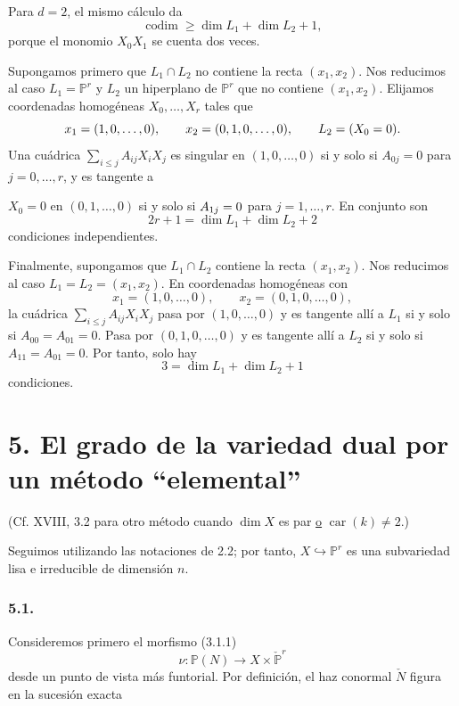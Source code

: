Para $d=2$, el mismo cálculo da
\[
\operatorname{codim}\geq\dim L_1+\dim L_2+1,
\]
porque el monomio $X_0X_1$ se cuenta dos veces.

Supongamos primero que $L_1\cap L_2$ no contiene la recta
$(x_1,x_2)$. Nos reducimos al caso $L_1=\mathbb P^r$ y $L_2$ un
hiperplano de $\mathbb P^r$ que no contiene $(x_1,x_2)$. Elijamos
coordenadas homogéneas $X_0,\ldots,X_r$ tales que
\[
x_1=(1,0,\ldots,0),\qquad
\sisi{x_1}{x_2}=(0,1,0,\ldots,0),\qquad L_2=(X_0=0).
\]
Una cuádrica $\sum_{i\leq j}A_{ij}X_iX_j$ es singular en
$(1,0,\ldots,0)$ si y solo si $A_{0j}=0$ para $j=0,\ldots,r$, y es
tangente a

\pageoriginale

$X_0=0$ en $(0,1,\ldots,0)$ si y solo si
$A_{\sisi{i}{1}j}=0$ para $j=1,\ldots,r$. En conjunto son
\[
2r+1=\dim L_1+\dim L_2+2
\]
condiciones independientes.

Finalmente, supongamos que $L_1\cap L_2$ contiene la recta
$(x_1,x_2)$. Nos reducimos al caso $L_1=L_2=(x_1,x_2)$. En
coordenadas homogéneas con
\[
x_1=(1,0,\ldots,0),\qquad x_2=(0,1,0,\ldots,0),
\]
la cuádrica $\sum_{i\leq j}A_{ij}X_iX_j$ pasa por
$(1,0,\ldots,0)$ y es tangente allí a $L_1$ si y solo si
$A_{00}=A_{01}=0$. Pasa por $(0,1,0,\ldots,0)$ y es tangente allí a
$L_2$ si y solo si $A_{11}=A_{01}=0$. Por tanto, solo hay
\[
3=\dim L_1+\dim L_2+1
\]
condiciones.

\section*{5. El grado de la variedad dual por un método
``elemental''}

(Cf. XVIII, 3.2 para otro método cuando $\dim X$ es par
\underline{o} $\operatorname{car}(k)\ne2$.)

Seguimos utilizando las notaciones de 2.2; por tanto,
$X\hookrightarrow\mathbb P^r$ es una subvariedad lisa e irreducible
de dimensión $n$.

\subsubsection*{5.1.}
Consideremos primero el morfismo (3.1.1)
\begin{equation}\tag{5.1.0}
\nu:\mathbb P(N)\longrightarrow X\times\check{\mathbb P}^{r}
\end{equation}
desde un punto de vista más funtorial. Por definición, el haz conormal
$\check N$ figura en la sucesión exacta

\pageoriginale

